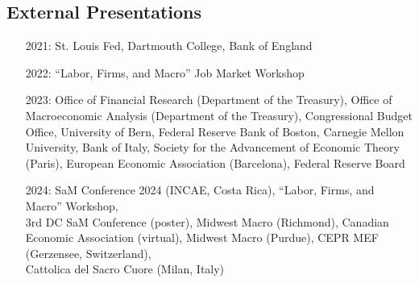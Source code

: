\documentclass[margin,line]{res}                          %
\newenvironment{list1}{
	\begin{list}{\ding{113}}{%
			\setlength{\itemsep}{0in}
			\setlength{\parsep}{0in} \setlength{\parskip}{0in}
			\setlength{\topsep}{0in} \setlength{\partopsep}{0in}
			\setlength{\leftmargin}{0.17in}}}{\end{list}}
\begin{document}
\begin{resume}
	\section{\sc External Presentations}
	\begin{list1}
		\item[]
		\begin{itemize}\setlength{\itemindent}{.3cm}
			\item[2021:]\makebox[0.1cm]{\hfill} St. Louis Fed, Dartmouth College, Bank of England\smallskip
			\item[2022:]\makebox[0.1cm]{\hfill} ``Labor, Firms, and Macro'' Job Market Workshop \smallskip
			\item[2023:]\makebox[0.1cm]{\hfill} Office of Financial Research (Department of the Treasury), Office of Macroeconomic \hspace*{0.55cm}Analysis (Department of the Treasury), Congressional Budget Office, University of Bern, \hspace*{0.55cm}Federal Reserve Bank of Boston, Carnegie Mellon University, Bank of Italy,  Society for \hspace*{0.55cm}the Advancement of Economic Theory (Paris), European Economic Association (Barcelona),
			\hspace*{0.55cm}Federal Reserve Board\smallskip
			\item[2024:]\makebox[0.1cm]{\hfill} SaM Conference 2024 (INCAE, Costa Rica), ``Labor, Firms, and Macro'' Workshop,\\ 
			\hspace*{0.55cm}3rd DC SaM Conference (poster), Midwest Macro (Richmond), Canadian Economic
			\hspace*{0.55cm}Association (virtual), Midwest Macro (Purdue), CEPR MEF (Gerzensee, Switzerland),\\
			\hspace*{0.55cm}Cattolica del Sacro Cuore (Milan, Italy)
		\end{itemize}		
	\end{list1}



\end{resume}
\end{document}
